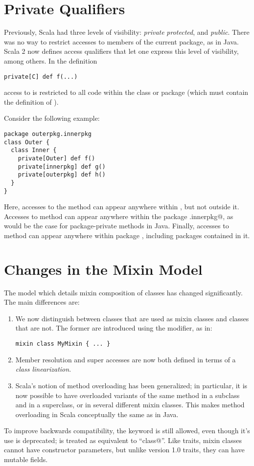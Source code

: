 \documentclass[a4paper,11pt,twoside]{article}
\begin{document}
\section{Private Qualifiers}

Previously, Scala had three levels of visibility: {\em private}
{\em protected}, and {\em public}. There was no way to
restrict accesses to members of the current package, as in Java. Scala
2 now defines access qualifiers that let one express this level of
visibility, among others. In the definition
\begin{lstlisting}
private[C] def f(...)
\end{lstlisting}
access to \lstinline@f@ is restricted to all code within the class or
package \lstinline@C@ (which must contain the definition of \lstinline@f@).

Consider the following example:
\begin{lstlisting}
package outerpkg.innerpkg
class Outer {
  class Inner {
    private[Outer] def f()
    private[innerpkg] def g()
    private[outerpkg] def h()
  }
}
\end{lstlisting}
Here, accesses to the method \lstinline@f@ can appear anywhere within
\lstinline@OuterClass@, but not outside it. Accesses to method
\lstinline@g@ can appear anywhere within the package
\lstinline@outerpkg.innerpkg@, as would be the case for
package-private methods in Java. Finally, accesses to method
\lstinline@h@ can appear anywhere within package \lstinline@outerpkg@,
including packages contained in it. 

\section{Changes in the Mixin Model}\label{sec:mixin-classes}

The model which details mixin composition of classes has changed
significantly. The main differences are:
\begin{enumerate}
\item
We now distinguish between classes that are used as mixin classes and
classes that are not. The former are introduced using the
\lstinline@mixin@ modifier, as in:
\begin{lstlisting}
mixin class MyMixin { ... }
\end{lstlisting}
\item
Member resolution and super accesses are now both defined in terms of
a {\em class linearization}. 
\item
Scala's notion of method overloading has been generalized; in
 particular, it is now possible to have overloaded variants of the
 same method in a subclass and in a superclass, or in several different
 mixin classes. This makes method overloading in Scala conceptually the
 same as in Java.
\end{enumerate}
To improve backwards compatibility, the \lstinline@trait@ keyword is
still allowed, even though it's use is deprecated; \lstinline@trait@
is treated as equivalent to ``\lstinline@mixin class@''. Like traits,
mixin classes cannot have constructor parameters, but unlike version
1.0 traits, they can have mutable fields.
\end{document}
